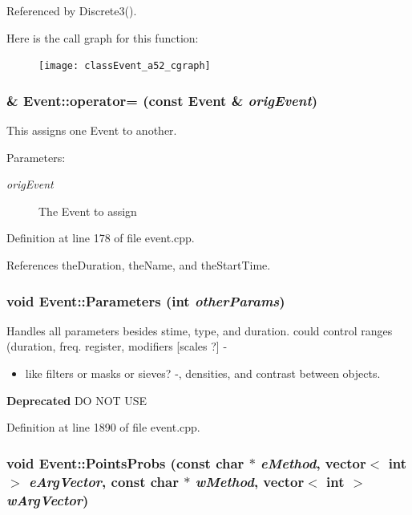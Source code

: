 Referenced by Discrete3().

Here is the call graph for this function:\begin{figure}[H]
\begin{center}
\leavevmode
\texttt{[image: classEvent\_a52\_cgraph]}
\end{center}
\end{figure}
\subsubsection{ \& Event::operator= (const {\bf Event} \& {\em orig\-Event})}\label{classEvent_a6}


This assigns one Event to another. \begin{Desc}
\item[Parameters:]
\begin{description}
\item[{\em orig\-Event}]The Event to assign \end{description}
\end{Desc}


Definition at line 178 of file event.cpp.

References the\-Duration, the\-Name, and the\-Start\-Time.
\subsubsection{\setlength{\rightskip}{0pt plus 5cm}void Event::Parameters (int {\em other\-Params})}\label{classEvent_a46}


Handles all parameters besides stime, type, and duration. could control ranges (duration, freq. register, modifiers [scales ?] -\begin{itemize}
\item like filters or masks or sieves? -, densities, and contrast between objects. \end{itemize}


\begin{Desc}
\item[{\bf Deprecated}]DO NOT USE \end{Desc}


Definition at line 1890 of file event.cpp.
\subsubsection{\setlength{\rightskip}{0pt plus 5cm}void Event::Points\-Probs (const char $\ast$ {\em e\-Method}, vector$<$ int $>$ {\em e\-Arg\-Vector}, const char $\ast$ {\em w\-Method}, vector$<$ int $>$ {\em w\-Arg\-Vector})}\label{classEvent_a40}


